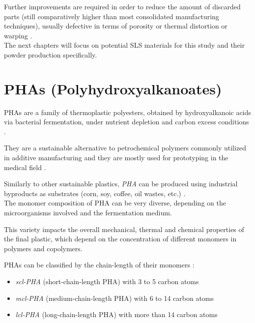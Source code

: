 \documentclass{article}
\begin{document}
    Further improvements are required in order to reduce the amount of discarded parts (still comparatively 
    higher than most consolidated manufacturing techniques), usually defective in terms of porosity or 
    thermal distortion or warping \autocite*{Padovano_SLS_Review}. \\ 

    The next chapters will focus on potential SLS materials for this study and their powder production specifically. \clearpage

    \section{PHAs (Polyhydroxyalkanoates)  \label{PHA_in_general}}

    PHAs are a family of thermoplastic polyesters, obtained by hydroxyalkanoic acids via bacterial fermentation, under 
    nutrient depletion and carbon excess conditions \autocites{Kovalcik_PHA_Review}{Messori_Bondioli_PHAs}. 

    They are a sustainable alternative to petrochemical polymers commonly utilized in 
    additive manufacturing and they are mostly used for prototyping in the medical field \autocites{Kovalcik_PHA_Review}{Messori_Bondioli_PHAs}. 

    Similarly to other sustainable plastics, \textit{PHA} can be produced using industrial byproducts as substrates (corn, soy, coffee, oil wastes, etc.)
    \autocite{Kovalcik_PHA_Review}. \\ 

    The monomer composition of PHA can be very diverse, depending on the microorganisms involved and the fermentation medium. 
    
    This variety impacts the overall mechanical, thermal and chemical properties of the final plastic, which depend on the concentration of 
    different monomers in polymers and copolymers. 

    PHAs can be classified by the chain-length of their monomers \autocite*{Messori_Bondioli_PHAs}: 

    \begin{itemize}
        \item \textit{scl-PHA} (short-chain-length PHA) with 3 to 5 carbon atoms
        \item \textit{mcl-PHA} (medium-chain-length PHA) with 6 to 14 carbon atoms
        \item \textit{lcl-PHA} (long-chain-length PHA) with more than 14 carbon atoms
    \end{itemize}
\end{document}
